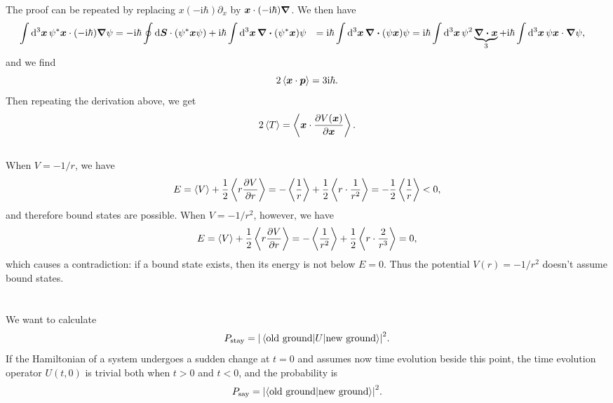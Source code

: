 \documentclass[hyperref, a4paper]{article}
\newcommand*{\ii}{\mathrm{i}}
\def\\{}%
\begin{document}
The proof can be repeated by replacing $x (- \ii \hbar) \partial_x$ 
by $\vb*{x} \cdot (- \ii \hbar) \grad$.
We then have 
\[
    \begin{aligned}
        \int \dd[3]{\vb*{x}} \psi^* \vb*{x} \cdot (- \ii \hbar) \grad \psi 
        &= - \ii \hbar \oint \dd{\vb*{S}} \cdot (\psi^* \vb*{x} \psi )
        + \ii \hbar \int \dd[3]{\vb*{x}} \div(\psi^* \vb*{x}) \psi \\
        &= \ii \hbar \int \dd[3]{\vb*{x}} \div(\psi \vb*{x}) \psi \\
        &= \ii \hbar \int \dd[3]{\vb*{x}} \psi^2 \underbrace{\div{\vb*{x}} }_{3}
        + \ii \hbar \int \dd[3]{\vb*{x}} \psi \vb*{x} \cdot \grad \psi ,
    \end{aligned}
\]
and we find 
\begin{equation}
    2 \expval{\vb*{x} \cdot \vb*{p}} = 3 \ii \hbar.
\end{equation}
Then repeating the derivation above, 
we get 
\begin{equation}
    2 \expval{T} = \expval{\vb*{x} \cdot \pdv{V(\vb*{x})}{\vb*{x}}}.
\end{equation}

\subsection{}

When $V = - 1 / r$, we have 
\begin{equation}
    E = \expval{V} + \frac{1}{2} \expval{r \pdv{V}{r}} 
    = - \expval{\frac{1}{r}} + \frac{1}{2} \expval{r \cdot \frac{1}{r^2}}
    = - \frac{1}{2} \expval{\frac{1}{r}} < 0,
\end{equation}
and therefore bound states are possible.
When $V = - 1 / r^2$, however, we have 
\begin{equation}
    E = \expval{V} + \frac{1}{2} \expval{r \pdv{V}{r}} 
    = - \expval{\frac{1}{r^2}} + \frac{1}{2} \expval{r \cdot \frac{2}{r^3}} = 0,
\end{equation} 
which causes a contradiction:
if a bound state exists, then its energy is not below $E = 0$.
Thus the potential $V(r) = - 1 / r^2$ doesn't assume bound states.

\section{}

We want to calculate 
\begin{equation}
    P_{\text{stay}} = \abs{\mel{\text{old ground}}{U}{\text{new ground}}}^2.
\end{equation}
If the Hamiltonian of a system undergoes a sudden change
at $t = 0$ and assumes now time evolution beside this point,
the time evolution operator $U(t, 0)$ is 
trivial both when $t > 0$ and $t < 0$,
and the probability is 
\begin{equation}
    P_{\text{say}} = \abs{\braket{\text{old ground}}{\text{new ground}}}^2.
\end{equation}
\end{document}
